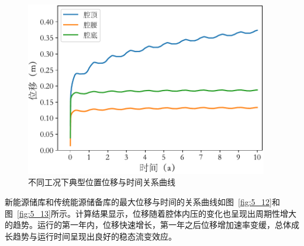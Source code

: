 \begin{figure}[ht!]
{\begin{minipage}{7cm}
            \includegraphics[width=0.95\textwidth]{img/chap5/位移/工况三顶部腰部底部位移与时间关系.pdf}
        \end{minipage}
    }
    \caption{不同工况下典型位置位移与时间关系曲线}
    \label{fig:5_20}
\end{figure}


新能源储库和传统能源储备库的最大位移与时间的关系曲线如图~\ref{fig:5_12}和图~\ref{fig:5_13}所示。计算结果显示，位移随着腔体内压的变化也呈现出周期性增大的趋势。运行的第一年内，位移快速增长，第一年之后位移增加速率变缓，总体成长趋势与运行时间呈现出良好的稳态流变效应。

